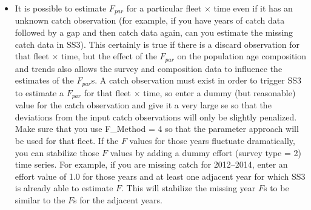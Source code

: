 \begin{itemize}
	\item It is possible to estimate $F_{par}$ for a particular fleet $\times$ time even if it has an unknown catch observation (for example, if you have years of catch data followed by a gap and then catch data again, can you estimate the missing catch data in SS3). This certainly is true if there is a discard observation for that fleet $\times$ time, but the effect of the $F_{par}$ on the population age composition and trends also allows the survey and composition data to influence the estimates of the $F_{par}$s. A catch observation must exist in order to trigger SS3 to estimate a $F_{par}$ for that fleet $\times$ time, so enter a dummy (but reasonable) value for the catch observation and give it a very large \gls{se} so that the deviations from the input catch observations will only be slightly penalized. Make sure that you use F\_Method = 4 so that the parameter approach will be used for that fleet. If the $F$ values for those years fluctuate dramatically, you can stabilize those $F$ values by adding a dummy effort (survey type = 2) time series. For example, if you are missing catch for 2012--2014, enter an effort value of 1.0 for those years and at least one adjacent year for which SS3 is already able to estimate $F$. This will stabilize the missing year $F$s to be similar to the $F$s for the adjacent years.

\end{itemize}

